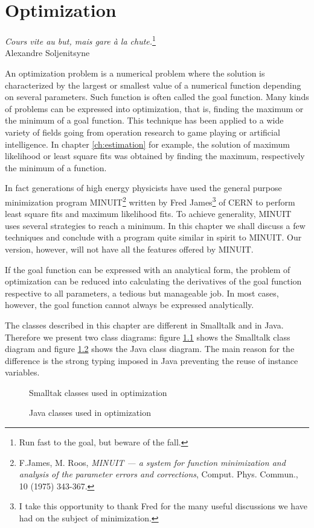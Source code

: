 \documentclass[twoside]{book}
\begin{document}
\fi

\chapter{Optimization}
\label{ch:minimization} \vspace{1 ex}
\begin{flushright}
{\sl Cours vite au but, mais gare \`a la chute.}\footnote{Run fast
to the goal, but beware of the fall.}\\ Alexandre Soljenitsyne
\end{flushright}
\vspace{1 ex} An optimization problem is a numerical problem where
the solution is characterized by the largest or smallest value of
a numerical function depending on several parameters. Such
function is often called the goal function. Many kinds of problems
can be expressed into optimization, that is, finding the maximum
or the minimum of a goal function. This technique has been applied
to a wide variety of fields going from operation research to game
playing or artificial intelligence. In chapter \ref{ch:estimation}
for example, the solution of maximum likelihood or least square
fits was obtained by finding the maximum, respectively the minimum
of a function.

In fact generations of high energy physicists have used the
general purpose minimization program MINUIT\footnote{F.James, M.
Roos, {\sl MINUIT --- a system for function minimization and
analysis of the parameter errors and corrections}, Comput. Phys.
Commun., 10 (1975) 343-367.} written by Fred James\footnote{I take
this opportunity to thank Fred for the many useful discussions we
have had on the subject of minimization.} of CERN to perform least
square fits and maximum likelihood fits.  To achieve generality,
MINUIT uses several strategies to reach a minimum. In this chapter
we shall discuss a few techniques and conclude with a program
quite similar in spirit to MINUIT. Our version, however, will not
have all the features offered by MINUIT.

If the goal function can be expressed with an analytical form, the
problem of optimization can be reduced into calculating the
derivatives of the goal function respective to all parameters, a
tedious but manageable job. In most cases, however, the goal
function cannot always be expressed analytically.

The classes described in this chapter are different in Smalltalk
and in Java. Therefore we present two class diagrams: figure
\ref{fig:soptimizingclasses} shows the Smalltalk class diagram and
figure \ref{fig:joptimizingclasses} shows the Java class diagram.
The main reason for the difference is the strong typing imposed in
Java preventing the reuse of instance variables.
\begin{figure}
\center{}
\caption{Smalltak classes used in optimization}
\label{fig:soptimizingclasses}
\end{figure}
\begin{figure}
\center{}
\caption{Java classes used in optimization}
\label{fig:joptimizingclasses}
\end{figure}
\end{document}

